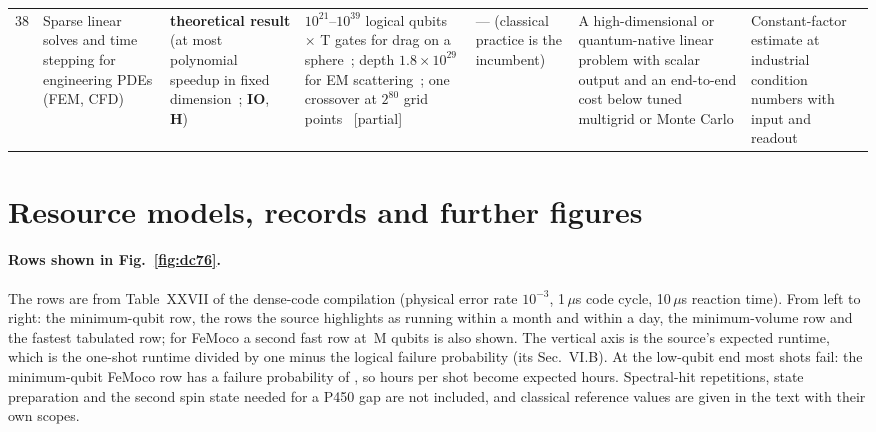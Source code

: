 \documentclass[10pt,a4paper]{article}
\newcommand{\psT}{\textcolor{qcQ}{\textbf{theoretical result}}}
\newcommand{\mtP}{\textcolor{qcF}{\textsf{partial}}}
\newcommand{\mech}[1]{\textsf{\textbf{#1}}}
\begin{document}
{\begin{longtable}{@{}r L{2.4cm} L{2.4cm} L{3.1cm} L{2.3cm} L{2.4cm} L{1.9cm}@{}}
38 & Sparse linear solves and time stepping for engineering PDEs (FEM, CFD) & \psT{} (at most polynomial speedup in fixed dimension~\cite{montanaro2016}; \mech{IO}, \mech{H}) & $10^{21}$--$10^{39}$ logical qubits $\times$ T gates for drag on a sphere~\cite{penuel2025}; depth $1.8\times10^{29}$ for EM scattering~\cite{scherer2017}; one crossover at $2^{80}$ grid points~\cite{zhuang2025} [\mtP] & --- (classical practice is the incumbent) & A high-dimensional or quantum-native linear problem with scalar output and an end-to-end cost below tuned multigrid or Monte Carlo & Constant-factor estimate at industrial condition numbers with input and readout\\
\end{longtable}
}

\section{Resource models, records and further figures}
\label{app:models}

\paragraph{Rows shown in Fig.~\ref{fig:dc76}.} The rows are from Table~XXVII of the dense-code compilation (physical error rate $10^{-3}$, 1\,$\mu$s code cycle, 10\,$\mu$s reaction time). From left to right: the minimum-qubit row, the rows the source highlights as running within a month and within a day, the minimum-volume row and the fastest tabulated row; for FeMoco a second fast row at \femoSevSelQ\,M qubits is also shown. The vertical axis is the source's expected runtime, which is the one-shot runtime divided by one minus the logical failure probability (its Sec.~VI.B). At the low-qubit end most shots fail: the minimum-qubit FeMoco row has a failure probability of \femoMinqPfail, so \femoMinqShot{} hours per shot become \femoMinqH{} expected hours. Spectral-hit repetitions, state preparation and the second spin state needed for a P450 gap are not included, and classical reference values are given in the text with their own scopes.
\end{document}
